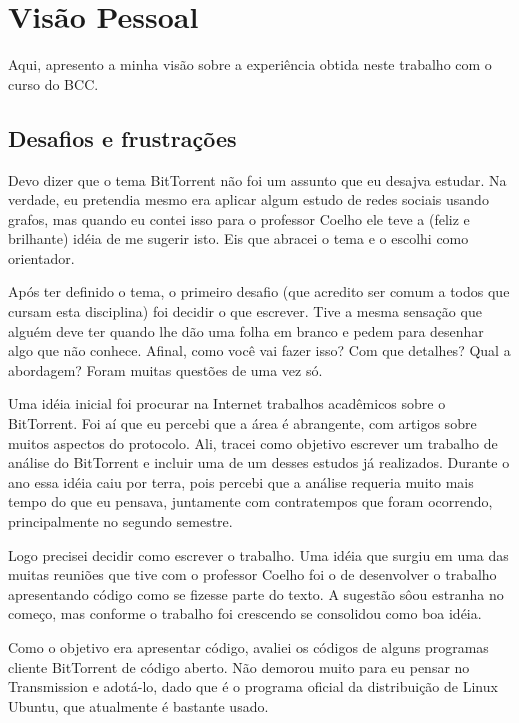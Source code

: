 
\chapter*{Visão Pessoal}

Aqui, apresento a minha visão sobre a experiência obtida neste trabalho com o curso do
BCC.

\section*{Desafios e frustrações}

Devo dizer que o tema BitTorrent não foi um assunto que eu desajva estudar. Na verdade,
eu pretendia mesmo era aplicar algum estudo de redes sociais usando grafos, mas quando
eu contei isso para o professor Coelho ele teve a (feliz e brilhante) idéia de me
sugerir isto. Eis que abracei o tema e o escolhi como orientador.

Após ter definido o tema, o primeiro desafio (que acredito ser comum a todos que cursam
esta disciplina) foi decidir o que escrever. Tive a mesma sensação que alguém deve ter
quando lhe dão uma folha em branco e pedem para desenhar algo que não conhece. Afinal,
como você vai fazer isso? Com que detalhes? Qual a abordagem? Foram muitas questões de
uma vez só.

Uma idéia inicial foi procurar na Internet trabalhos acadêmicos sobre o BitTorrent. Foi
aí que eu percebi que a área é abrangente, com artigos sobre muitos aspectos do
protocolo. Ali, tracei como objetivo escrever um trabalho de análise do BitTorrent e
incluir uma de um desses estudos já realizados. Durante o ano essa idéia caiu por terra,
pois percebi que a análise requeria muito mais tempo do que eu pensava, juntamente com
contratempos que foram ocorrendo, principalmente no segundo semestre.

Logo precisei decidir como escrever o trabalho. Uma idéia que surgiu em uma das muitas
reuniões que tive com o professor Coelho foi o de desenvolver o trabalho apresentando
código como se fizesse parte do texto. A sugestão sôou estranha no começo, mas conforme
o trabalho foi crescendo se consolidou como boa idéia.

Como o objetivo era apresentar código, avaliei os códigos de alguns programas cliente
BitTorrent de código aberto. Não demorou muito para eu pensar no Transmission e
adotá-lo, dado que é o programa oficial da distribuição de Linux Ubuntu, que atualmente
é bastante usado.

